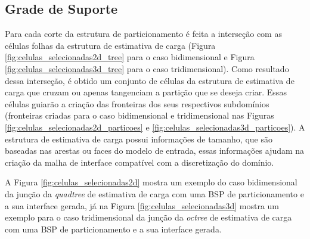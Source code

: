 \subsection{Grade de Suporte}
\label{sec:Grade_Suporte}

Para cada corte da estrutura de particionamento é feita a interseção com as células folhas da estrutura de estimativa de carga (Figura \ref{fig:celulas_selecionadas2d_tree} para o caso bidimensional e Figura \ref{fig:celulas_selecionadas3d_tree} para o caso tridimensional). Como resultado dessa interseção, é obtido um conjunto de células da estrutura de estimativa de carga que cruzam ou apenas tangenciam a partição que se deseja criar. Essas células guiarão a criação das fronteiras dos seus respectivos subdomínios (fronteiras criadas para o caso bidimensional e tridimensional nas Figuras \ref{fig:celulas_selecionadas2d_particoes} e \ref{fig:celulas_selecionadas3d_particoes}). A estrutura de estimativa de carga possui informações de tamanho, que são baseadas nas arestas ou faces do modelo de entrada, essas informações ajudam na criação da malha de interface compatível com a discretização do domínio.

A Figura \ref{fig:celulas_selecionadas2d} mostra um exemplo do caso bidimensional da junção da \textit{quadtree} de estimativa de carga com uma BSP de particionamento e a sua interface gerada, já na Figura \ref{fig:celulas_selecionadas3d} mostra um exemplo para o caso tridimensional da junção da \textit{octree} de estimativa de carga com uma BSP de particionamento e a sua interface gerada.

